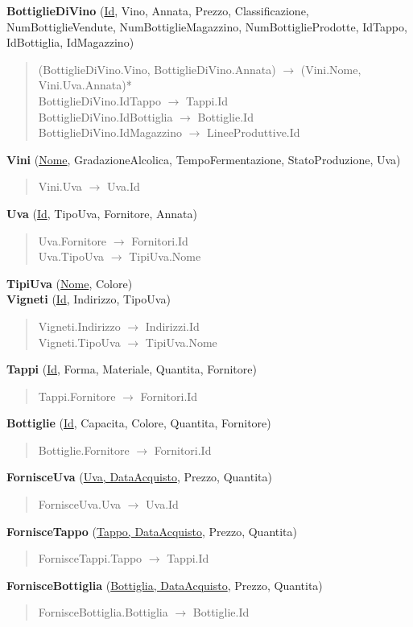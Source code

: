 \textbf{BottiglieDiVino} (\underline{Id}, Vino, Annata, Prezzo, Classificazione, NumBottiglieVendute, NumBottiglieMagazzino, NumBottiglieProdotte, IdTappo, IdBottiglia, IdMagazzino)
\begin{verse}
	(BottiglieDiVino.Vino, BottiglieDiVino.Annata) $\to$ (Vini.Nome, Vini.Uva.Annata)*\\
	BottiglieDiVino.IdTappo $\to$ Tappi.Id\\
	BottiglieDiVino.IdBottiglia $\to$ Bottiglie.Id\\
	BottiglieDiVino.IdMagazzino $\to$ LineeProduttive.Id
\end{verse} 
\textbf{Vini} (\underline{Nome}, GradazioneAlcolica, TempoFermentazione, StatoProduzione, Uva)
\begin{verse}
	Vini.Uva $\to$ Uva.Id
\end{verse} 
\textbf{Uva} (\underline{Id}, TipoUva, Fornitore, Annata)
\begin{verse}
	Uva.Fornitore $\to$ Fornitori.Id\\
	Uva.TipoUva $\to$ TipiUva.Nome
\end{verse}
\textbf{TipiUva} (\underline{Nome}, Colore)\\
\textbf{Vigneti} (\underline{Id}, Indirizzo, TipoUva)
\begin{verse}
	Vigneti.Indirizzo $\to$ Indirizzi.Id\\
	Vigneti.TipoUva $\to$ TipiUva.Nome\\
\end{verse} 
\textbf{Tappi} (\underline{Id}, Forma, Materiale, Quantita, Fornitore)
\begin{verse}
	Tappi.Fornitore $\to$ Fornitori.Id
\end{verse}
\textbf{Bottiglie} (\underline{Id}, Capacita, Colore, Quantita, Fornitore)
\begin{verse}
	Bottiglie.Fornitore $\to$ Fornitori.Id
\end{verse}
\textbf{FornisceUva} (\underline{Uva, DataAcquisto}, Prezzo, Quantita)
\begin{verse}
	FornisceUva.Uva $\to$ Uva.Id
\end{verse}
\textbf{FornisceTappo} (\underline{Tappo, DataAcquisto}, Prezzo, Quantita)
\begin{verse}
	FornisceTappi.Tappo $\to$ Tappi.Id
\end{verse} 
\textbf{FornisceBottiglia} (\underline{Bottiglia, DataAcquisto}, Prezzo, Quantita)
\begin{verse}
	FornisceBottiglia.Bottiglia $\to$ Bottiglie.Id
\end{verse} 
